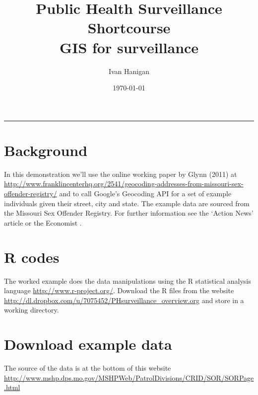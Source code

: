 \documentclass[a4paper]{article}
\title{Public Health Surveillance Shortcourse \\GIS for surveillance}
\author{Ivan Hanigan}
\date{\today}
\begin{document}
\maketitle

\setcounter{tocdepth}{3}
\tableofcontents
\vspace*{1cm}
\hrule

\section{Background}
\label{sec-1}

In this demonstration we'll use the online working paper by Glynn (2011) at \href{http://www.franklincenterhq.org/2541/geocoding-addresses-from-missouri-sex-offender-registry/}{http://www.franklincenterhq.org/2541/geocoding-addresses-from-missouri-sex-offender-registry/}
\cite{Glynn2011} and \cite{Glynn} to call Google's Geocoding API
\cite{Google} for a set of example individuals given their street,
city and state.  The example data are sourced from the Missouri Sex
Offender Registry. For further information see the `Action News'
article \cite{Kath2011} or the Economist \cite{TheEconomi2009}.
\section{R codes}
\label{sec-2}

The worked example does the data manipulations using the R statistical
analysis language \href{http://www.r-project.org/}{http://www.r-project.org/}. Download the R files from
the website \href{http://dl.dropbox.com/u/7075452/PHsurveillance_overview.org}{http://dl.dropbox.com/u/7075452/PHsurveillance\_overview.org} and store in a working directory. 

\section{Download example data}
\label{sec-3}

The source of the data is at the bottom of this website \\ 
\href{http://www.mshp.dps.mo.gov/MSHPWeb/PatrolDivisions/CRID/SOR/SORPage.html}{http://www.mshp.dps.mo.gov/MSHPWeb/PatrolDivisions/CRID/SOR/SORPage.html}
\end{document}
